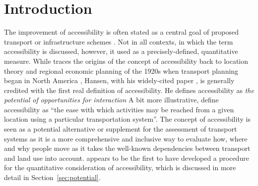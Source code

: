 \section{Introduction}
The improvement of accessibility is often stated as a central goal of proposed transport or infrastructure 
schemes \citep{GeursEtAl2012AccessibilityTransportIntroduction}. Not in all contexts, in which the term 
accessibility is discussed, however, it used as a precisely-defined, quantitative measure. While 
\citet{Batty2009AccessibilityUnifiedTheory} traces the origins of the concept of accessibility back to 
location theory and regional economic planning of the 1920s when transport planning began in North America
\citep{GeursEtAl2012AccessibilityTransportIntroduction}, 
Hansen, with his widely-cited paper \citep{Hansen1959HowAccessibilityShapesLandUse}, is generally credited 
with the first real definition of accessibility. He defines accessibility 
as \emph{the potential of opportunities for interaction} 
A bit more illustrative, \citet{MorrisEtAl1978AccessibilityIndicators} define accessibility as ``the ease with 
which activities may be reached from a given location using a particular transportation system''.
The concept of accessibility is seen as a potential alternative or supplement for the assessment 
of transport systems as it is a more comprehensive and inclusive way to evaluate how, where and why 
people move as it takes the well-known dependencies between transport and land use into account.
\citet{Hansen1959HowAccessibilityShapesLandUse} appears to be the first to have developed a procedure for 
the quantitative consideration of accessibility, which is discussed in more detail in Section~\ref{sec:potential}.



